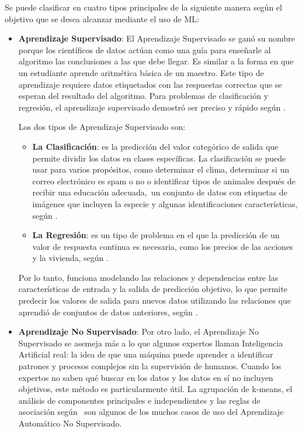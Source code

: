 Se puede clasificar en cuatro tipos principales de la siguiente manera según el objetivo que se desea alcanzar mediante el uso de ML:
\begin{itemize}
	\item \textbf{Aprendizaje Supervisado}: El Aprendizaje Supervisado se ganó su nombre porque los científicos de datos actúan como una guía para enseñarle al algoritmo las conclusiones a las que debe llegar. Es similar a la forma en que un estudiante aprende aritmética básica de un maestro. Este tipo de aprendizaje requiere datos etiquetados con las respuestas correctas que se esperan del resultado del algoritmo. Para problemas de clasificación y regresión, el aprendizaje supervisado demostró ser preciso y rápido según \parencite{bk_zambrano2018supnosup}.
	
	Los dos tipos de Aprendizaje Supervisado son:

	\begin{itemize}
		\item \textbf{La Clasificación}: es la predicción del valor categórico de salida que permite dividir los datos en clases específicas. La clasificación se puede usar para varios propósitos, como determinar el clima, determinar si un correo electrónico es spam o no o identificar tipos de animales después de recibir una educación adecuada, un conjunto de datos con etiquetas de imágenes que incluyen la especie y algunas identificaciones características, según \parencite{bk_zambrano2018supnosup}.
		\item \textbf{La Regresión}: es un tipo de problema en el que la predicción de un valor de respuesta continua es necesaria, como los precios de las acciones y la vivienda, según \parencite{bk_zambrano2018supnosup}.
	\end{itemize}

	Por lo tanto, funciona modelando las relaciones y dependencias entre las características de entrada y la salida de predicción objetivo, lo que permite predecir los valores de salida para nuevos datos utilizando las relaciones que aprendió de conjuntos de datos anteriores, según \parencite{bk_alpaydin2014ml}.

	\item \textbf{Aprendizaje No Supervisado}: Por otro lado, el Aprendizaje No Supervisado se asemeja más a lo que algunos expertos llaman Inteligencia Artificial real: la idea de que una máquina puede aprender a identificar patrones y procesos complejos sin la supervisión de humanos. Cuando los expertos no saben qué buscar en los datos y los datos en sí no incluyen objetivos, este método es particularmente útil. La agrupación de k-means, el análisis de componentes principales e independientes y las reglas de asociación según \parencite{bk_zambrano2018supnosup} son algunos de los muchos casos de uso del Aprendizaje Automático No Supervisado.
	

\end{itemize}
